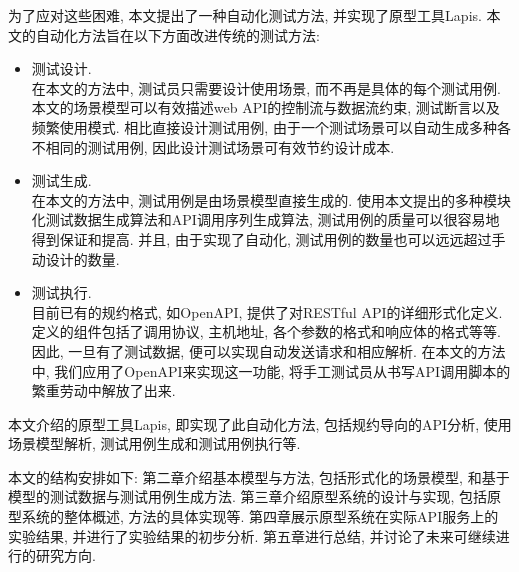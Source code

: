         为了应对这些困难, 本文提出了一种自动化测试方法, 并实现了原型工具Lapis. 本文的自动化方法旨在以下方面改进传统的测试方法:
        \begin{itemize}
            \item 测试设计. \\
                在本文的方法中, 测试员只需要设计使用场景, 而不再是具体的每个测试用例. 本文的场景模型可以有效描述web API的控制流与数据流约束, 测试断言以及频繁使用模式. 相比直接设计测试用例, 由于一个测试场景可以自动生成多种各不相同的测试用例, 因此设计测试场景可有效节约设计成本.
            
            \item 测试生成.\\
                在本文的方法中, 测试用例是由场景模型直接生成的. 使用本文提出的多种模块化测试数据生成算法和API调用序列生成算法, 测试用例的质量可以很容易地得到保证和提高. 并且, 由于实现了自动化, 测试用例的数量也可以远远超过手动设计的数量.
            
            \item 测试执行.\\
                目前已有的规约格式, 如OpenAPI, 提供了对RESTful API的详细形式化定义. 定义的组件包括了调用协议, 主机地址, 各个参数的格式和响应体的格式等等. 因此, 一旦有了测试数据, 便可以实现自动发送请求和相应解析. 在本文的方法中, 我们应用了OpenAPI来实现这一功能, 将手工测试员从书写API调用脚本的繁重劳动中解放了出来.
        \end{itemize}
        本文介绍的原型工具Lapis, 即实现了此自动化方法, 包括规约导向的API分析, 使用场景模型解析, 测试用例生成和测试用例执行等.
        
        本文的结构安排如下: 第二章介绍基本模型与方法, 包括形式化的场景模型, 和基于模型的测试数据与测试用例生成方法. 第三章介绍原型系统的设计与实现, 包括原型系统的整体概述, 方法的具体实现等. 第四章展示原型系统在实际API服务上的实验结果, 并进行了实验结果的初步分析. 第五章进行总结, 并讨论了未来可继续进行的研究方向.
        
        

